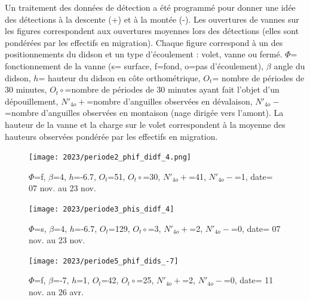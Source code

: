 \documentclass[11pt,twocolumn,titlepage,twoside]{article}
\begin{document}
Un traitement des données de détection a été programmé pour donner une idée des
détections à la descente (+) et à la montée (-). Les ouvertures de vannes sur
les figures correspondent aux ouvertures moyennes lors des détections (elles
sont pondérées par les effectifs en migration). Chaque figure correspond à un des
positionnements du didson et un type d'écoulement : volet, vanne ou fermé.  
$\Phi$= fonctionnement de la vanne (s= surface, f=fond, o=pas d'écoulement), $\beta$ angle du didson, 
$h$= hauteur du didson en côte orthométrique, $O_t$=
nombre de périodes de 30 minutes, $O_t\circ$=nombre de périodes de 30
minutes ayant fait l'objet d'un dépouillement, $N'_{4o}+$=nombre
d'anguilles observées en dévalaison, $N'_{4o}-$=nombre d'anguilles
observées en montaison (nage dirigée vers l'amont). La hauteur de la
vanne et la charge sur le volet correspondent à la moyenne des hauteurs
observées pondérée par les effectifs en migration.

\begin{figure}[htbp]
        \centering
        \texttt{[image: 2023/periode2\_phif\_didf\_4.png]}
        \caption{
                $\Phi$=f, 
                $\beta$=4, 
                $h$=-6.7, 
                $O_t$=51, 
                $O_t\circ$=30,
                $N'_{4o}+$=41, 
                $N'_{4o}-$=1,
                date= 07 nov. au 23 nov.
                }
                \label{periode4}
\end{figure}

\begin{figure}[htbp]
        \centering
        \texttt{[image: 2023/periode3\_phis\_didf\_4]}
        \caption{
                $\Phi$=s, 
                $\beta$=4, 
                $h$=-6.7, 
                $O_t$=129, 
                $O_t\circ$=3,
                $N'_{4o}+$=2, 
                $N'_{4o}-$=0,
                date= 07 nov. au 23 nov.}
        \label{periode6}
\end{figure}



\begin{figure}[htbp]
        \centering
        \texttt{[image: 2023/periode5\_phif\_dids\_-7]}
        \caption{
                $\Phi$=f, 
                $\beta$=-7, 
                $h$=1, 
                $O_t$=42, 
                $O_t\circ$=25,
                $N'_{4o}+$=2, 
                $N'_{4o}-$=0,
                date= 11 nov. au 26 avr.               
               }
                \label{periode11}
\end{figure}
\end{document}
